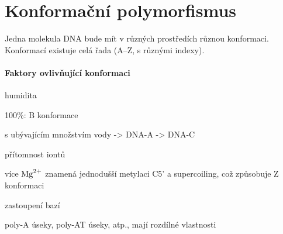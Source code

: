 \documentclass[DIV=8]{scrreprt}
\begin{document}
\section{Konformační polymorfismus} \label{Konformační polymorfismus} \FloatBarrier


Jedna molekula DNA bude mít v různých prostředích různou konformaci. Konformací existuje celá řada (A--Z, s různými indexy).

\paragraph{Faktory ovlivňující konformaci}
\begin{myItemize}[nosep]
    \item humidita
\begin{myItemize}[nosep]
    \item 100\%: B konformace
    \item s ubývajícím množstvím vody -> DNA-A -> DNA-C
\end{myItemize}

    \item přítomnost iontů
\begin{myItemize}[nosep]
    \item více \(\ce{Mg^{2+}}\) znamená jednodušší metylaci C5' a supercoiling, což způsobuje Z konformaci
\end{myItemize}

    \item zastoupení bazí
\begin{myItemize}[nosep]
    \item poly-A úseky, poly-AT úseky, atp., mají rozdílné vlastnosti
\end{myItemize}

\end{myItemize}



\end{document}

